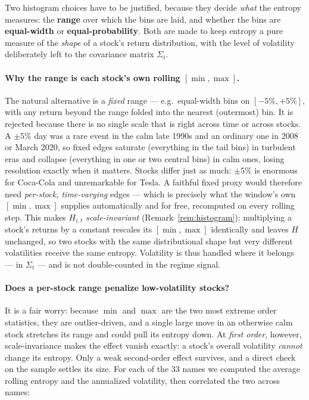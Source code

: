 \documentclass[a4paper,12pt]{article}
\begin{document}
Two histogram choices have to be justified, because they decide \emph{what} the entropy measures: the \textbf{range} over which the bins are laid, and whether the bins are \textbf{equal-width} or \textbf{equal-probability}. Both are made to keep entropy a pure measure of the \emph{shape} of a stock's return distribution, with the level of volatility deliberately left to the covariance matrix $\Sigma_t$.

\paragraph{Why the range is each stock's own rolling $[\min,\max]$.} The natural alternative is a \emph{fixed} range --- e.g.\ equal-width bins on $[-5\%,+5\%]$, with any return beyond the range folded into the nearest (outermost) bin. It is rejected because there is no single scale that is right across time or across stocks. A $\pm5\%$ day was a rare event in the calm late 1990s and an ordinary one in 2008 or March 2020, so fixed edges saturate (everything in the tail bins) in turbulent eras and collapse (everything in one or two central bins) in calm ones, losing resolution exactly when it matters. Stocks differ just as much: $\pm5\%$ is enormous for Coca-Cola and unremarkable for Tesla. A faithful fixed proxy would therefore need \emph{per-stock, time-varying} edges --- which is precisely what the window's own $[\min,\max]$ supplies automatically and for free, recomputed on every rolling step. This makes $H_{i,t}$ \emph{scale-invariant} (Remark~\ref{rem:histogram}): multiplying a stock's returns by a constant rescales its $[\min,\max]$ identically and leaves $H$ unchanged, so two stocks with the same distributional shape but very different volatilities receive the same entropy. Volatility is thus handled where it belongs --- in $\Sigma_t$ --- and is not double-counted in the regime signal.

\paragraph{Does a per-stock range penalize low-volatility stocks?} It is a fair worry: because $\min$ and $\max$ are the two most extreme order statistics, they are outlier-driven, and a single large move in an otherwise calm stock stretches its range and could pull its entropy down. At \emph{first order}, however, scale-invariance makes the effect vanish exactly: a stock's overall volatility \emph{cannot} change its entropy. Only a weak second-order effect survives, and a direct check on the sample settles its size. For each of the 33 names we computed the average rolling entropy and the annualized volatility, then correlated the two across names:
\end{document}
